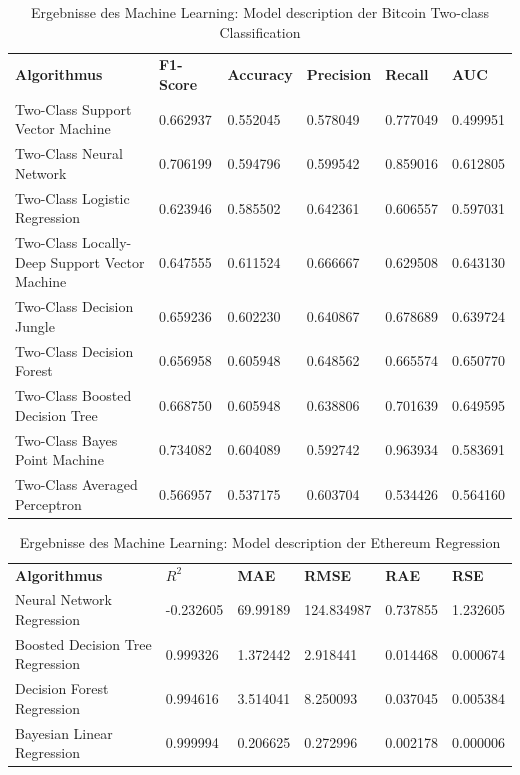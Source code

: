 \begin{table}[H]
\centering
\begin{tabular}{|p{5cm}|p{}|p{}|p{}|p{}|p{}|}
\hline
\textbf{Algorithmus} & \textbf{F1-Score} & \textbf{Accuracy} & \textbf{Precision} & \textbf{Recall} & \textbf{AUC}\\ 
\hhline{======}
Two-Class Support Vector Machine & 0.662937 & 0.552045 & 0.578049 & 0.777049 & 0.499951 \\ \hline
Two-Class Neural Network & 0.706199 & 0.594796 & 0.599542 & 0.859016 & 0.612805 \\ \hline
Two-Class Logistic Regression & 0.623946 & 0.585502 & 0.642361 & 0.606557 & 0.597031 \\ \hline
Two-Class Locally-Deep Support Vector Machine & 0.647555 & 0.611524 & 0.666667 & 0.629508 & 0.643130 \\ \hline
Two-Class Decision Jungle & 0.659236 & 0.602230 & 0.640867 & 0.678689 & 0.639724 \\ \hline
Two-Class Decision Forest & 0.656958 & 0.605948 & 0.648562 & 0.665574 & 0.650770 \\ \hline
Two-Class Boosted Decision Tree & 0.668750 & 0.605948 & 0.638806 & 0.701639 & 0.649595 \\ \hline
Two-Class Bayes Point Machine & 0.734082 & 0.604089 & 0.592742 & 0.963934 & 0.583691 \\ \hline
Two-Class Averaged Perceptron & 0.566957 & 0.537175 & 0.603704 & 0.534426 & 0.564160 \\ \hline
\end{tabular}
\caption{Ergebnisse des Machine Learning: Model description der Bitcoin Two-class Classification}
\end{table}

\begin{table}[H]
\centering
\begin{tabular}{|p{4cm}|p{}|p{}|p{}|p{}|p{}|}
\hline
\textbf{Algorithmus} & \textbf{$ R^2 $} & \textbf{MAE} & \textbf{RMSE} & \textbf{RAE} & \textbf{RSE}\\ 
\hhline{======}
Neural Network Regression & -0.232605 & 69.99189 & 124.834987 & 0.737855 & 1.232605 \\ \hline
Boosted Decision Tree Regression & 0.999326 & 1.372442 & 2.918441 & 0.014468 & 0.000674 \\ \hline
Decision Forest Regression & 0.994616 & 3.514041 & 8.250093 & 0.037045 & 0.005384 \\ \hline
Bayesian Linear Regression & 0.999994 & 0.206625 & 0.272996 & 0.002178 & 0.000006 \\ \hline
\end{tabular}
\caption{Ergebnisse des Machine Learning: Model description der Ethereum Regression}
\end{table}

